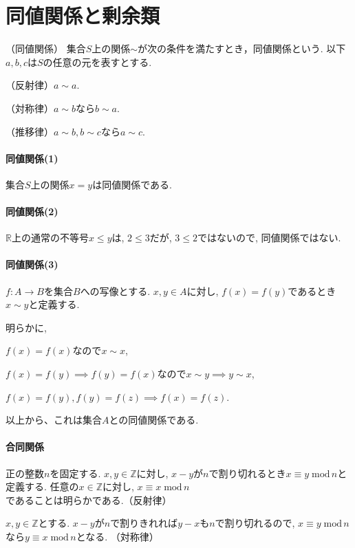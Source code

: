 \section*{同値関係と剰余類}

\begin{dfn*}
	（同値関係）
	集合$S$上の関係$\sim$が次の条件を満たすとき，同値関係という.
	以下$a,b,c$は$S$の任意の元を表すとする.
	
	（反射律）$a\sim a$.

	（対称律）$a\sim b$なら$b\sim a$.

	（推移律）$a\sim b, b\sim c$なら$a\sim c$.
\end{dfn*}

\paragraph*{同値関係(1)}
	集合$S$上の関係$x=y$は同値関係である.\newline
\paragraph*{同値関係(2)}
	$\mathbb{R}$上の通常の不等号$x\leq y$は, $2\leq 3$だが, 
$3\leq 2$ではないので, 同値関係ではない.\newline
\paragraph*{同値関係(3)}
$f:A\to B$を集合$B$への写像とする. 
$x,y \in A$に対し, $f(x)=f(y)$であるとき$x\sim y$と定義する.

明らかに,
 
$f(x)=f(x)$なので$x \sim x$,
 
$f(x)=f(y) \implies f(y)=f(x)$なので$x \sim y \implies y \sim x$,
 
$f(x)=f(y), f(y)=f(z) \implies f(x)=f(z)$.
 
以上から、これは集合$A$との同値関係である.\newline

\paragraph*{合同関係}
正の整数$n$を固定する. $x,y \in \mathbb{Z}$に対し,
$x-y$が$n$で割り切れるとき$x\equiv y \; \mathrm{mod} \, n$と定義する.
任意の$x \in \mathbb{Z}$に対し,
$x\equiv x\; \mathrm{mod} \, n $であることは明らかである.（反射律）

$x,y \in \mathbb{Z}$とする. $x-y$が$n$で割りきれれば$y-x$も$n$で割り切れるので,
$x \equiv y\; \mathrm{mod}\, n$なら$y\equiv x \; \mathrm{mod}\, n$となる.
（対称律）

